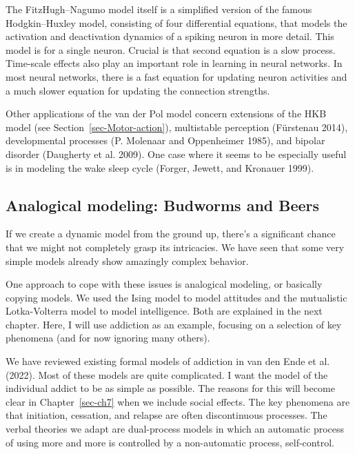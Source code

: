 \documentclass[
  a4paper,
  DIV=11,
  numbers=noendperiod,
  oneside]{scrreprt}
\begin{document}
The FitzHugh--Nagumo model itself is a simplified version of the famous
Hodgkin--Huxley model, consisting of four differential equations, that
models the activation and deactivation dynamics of a spiking neuron in
more detail. This model is for a single neuron. Crucial is that second
equation is a slow process. Time-scale effects also play an important
role in learning in neural networks. In most neural networks, there is a
fast equation for updating neuron activities and a much slower equation
for updating the connection strengths.

Other applications of the van der Pol model concern extensions of the
HKB model (see Section~\ref{sec-Motor-action}), multistable perception
(Fürstenau 2014), developmental processes (P. Molenaar and Oppenheimer
1985), and bipolar disorder (Daugherty et al. 2009). One case where it
seems to be especially useful is in modeling the wake sleep cycle
(Forger, Jewett, and Kronauer 1999).

\hypertarget{sec-Analogical-modeling-Budworms-and-Beers}{%
\subsection{Analogical modeling: Budworms and
Beers}\label{sec-Analogical-modeling-Budworms-and-Beers}}

If we create a dynamic model from the ground up, there's a significant
chance that we might not completely grasp its intricacies. We have seen
that some very simple models already show amazingly complex behavior.

One approach to cope with these issues is analogical modeling, or
basically copying models. We used the Ising model to model attitudes and
the mutualistic Lotka-Volterra model to model intelligence. Both are
explained in the next chapter. Here, I will use addiction as an example,
focusing on a selection of key phenomena (and for now ignoring many
others).

We have reviewed existing formal models of addiction in van den Ende et
al. (2022). Most of these models are quite complicated. I want the model
of the individual addict to be as simple as possible. The reasons for
this will become clear in Chapter~\ref{sec-ch7} when we include social
effects. The key phenomena are that initiation, cessation, and relapse
are often discontinuous processes. The verbal theories we adapt are
dual-process models in which an automatic process of using more and more
is controlled by a non-automatic process, self-control.
\end{document}
